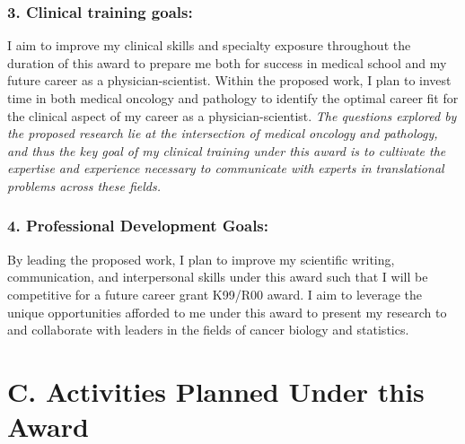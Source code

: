 \documentclass{NIHGrant}
\begin{document}
\subsubsection*{3. Clinical training goals:}
I aim to improve my clinical skills and specialty exposure throughout the duration of this award to prepare me both for success in medical school and my future career as a physician-scientist. Within the proposed work, I plan to invest time in both medical oncology and pathology to identify the optimal career fit for the clinical aspect of my career as a physician-scientist. \emph{The questions explored by the proposed research lie at the intersection of medical oncology and pathology, and thus the key goal of my clinical training under this award is to cultivate the expertise and experience necessary to communicate with experts in translational problems across these fields.}

\subsubsection*{4. Professional Development Goals:}
By leading the proposed work, I plan to improve my scientific writing, communication, and interpersonal skills under this award such that I will be competitive for a future career grant K99/R00 award. I aim to leverage the unique opportunities afforded to me under this award to present my research to and collaborate with leaders in the fields of cancer biology and statistics.

\section*{C. Activities Planned Under this Award}
\end{document}
